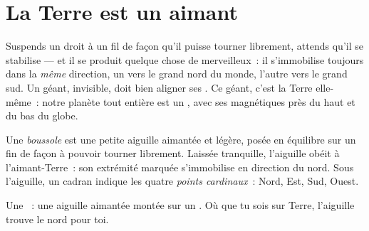\section{La Terre est un aimant}

\begin{example}\label{ex:g4:magnets-and-compass:earth}
Suspends un  droit à un fil de façon qu'il puisse tourner
librement, attends qu'il se stabilise --- et il se produit quelque
chose de merveilleux~: il s'immobilise toujours dans la \emph{même}
direction, un  vers le grand nord du monde, l'autre vers le grand
sud. Un  géant, invisible, doit bien aligner ses . Ce
géant, c'est la Terre elle-même~: notre planète tout entière est un
, avec ses  magnétiques près du haut et du bas du globe.
\end{example}

\begin{definition}[Boussole]\label{def:g4:magnets-and-compass:compass}
Une \emph{boussole} est une petite aiguille aimantée
et légère, posée en équilibre sur un  fin de façon à pouvoir
tourner librement. Laissée tranquille, l'aiguille obéit à
l'aimant-Terre~: son extrémité marquée s'immobilise en direction du
nord. Sous l'aiguille, un cadran indique les quatre \emph{points
cardinaux}~: Nord, Est, Sud, Ouest.
\end{definition}

\begin{omfigure}

{\small Une ~: une aiguille aimantée montée sur un . Où
que tu sois sur Terre, l'aiguille trouve le nord pour toi.}
\end{omfigure}

